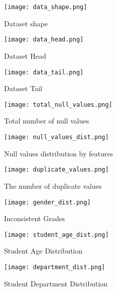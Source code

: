 \begin{figure}[H] %
	\texttt{[image: data\_shape.png]}
	\caption{Dataset shape \label{fig:data_shape}}
\end{figure} 

\begin{figure}[H]
	\texttt{[image: data\_head.png]}
	\caption{Dataset Head \label{fig:data_head}}
\end{figure}

\begin{figure}[H]
	\texttt{[image: data\_tail.png]}
	\caption{Dataset Tail \label{fig:data_tail}}
\end{figure}




\begin{figure}[H] %
	\centering %
	\texttt{[image: total\_null\_values.png]}
	\caption{Total number of null values \label{fig:total_null_values}}
\end{figure}

\begin{figure} %
	\centering %
	\texttt{[image: null\_values\_dist.png]}
	\caption{Null values distribution by features \label{fig:null_values_dist}}
\end{figure}

\begin{figure}[H]
	\centering %
	\texttt{[image: duplicate\_values.png]}
	\caption{The number of duplicate values \label{fig:duplicate_values}}
\end{figure}

\begin{figure}[H]
	\centering %
	\texttt{[image: gender\_dist.png]}
	\caption{Inconsistent Grades \label{fig:gender_dist}}
\end{figure}

\begin{figure}[H]
	\centering %
	\texttt{[image: student\_age\_dist.png]}
	\caption{Student Age Distribution \label{fig:stud_age_dist}}
\end{figure}

\begin{figure}[H]
	\centering %
	\texttt{[image: department\_dist.png]}
	\caption{Student Department Distribution \label{fig:dept_dist}}
\end{figure}

